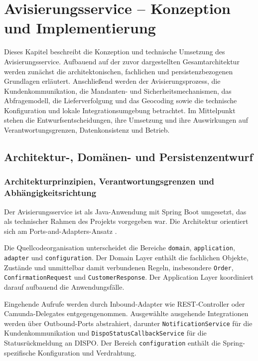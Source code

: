 \documentclass[
  12pt,
  a4paper,
  oneside
]{article}
\begin{document}
\tableofcontents
\clearpage

\setcounter{section}{4}

\section{Avisierungsservice -- Konzeption und Implementierung}

Dieses Kapitel beschreibt die Konzeption und technische Umsetzung des
Avisierungsservice. Aufbauend auf der zuvor dargestellten Gesamtarchitektur
werden zunächst die architektonischen, fachlichen und persistenzbezogenen
Grundlagen erläutert. Anschließend werden der Avisierungsprozess, die
Kundenkommunikation, die Mandanten- und
Sicherheitsmechanismen, das Abfragemodell, die Lieferverfolgung und das
Geocoding sowie die technische Konfiguration und lokale Integrationsumgebung
betrachtet. Im Mittelpunkt stehen die Entwurfsentscheidungen, ihre Umsetzung
und ihre Auswirkungen auf Verantwortungsgrenzen, Datenkonsistenz und Betrieb.

\subsection{Architektur-, Domänen- und Persistenzentwurf}
\label{sec:architektur-domaenenentwurf}

\subsubsection{Architekturprinzipien, Verantwortungsgrenzen und Abhängigkeitsrichtung}
\label{sec:architekturprinzipien}

Der Avisierungsservice ist als Java-Anwendung mit Spring Boot umgesetzt, das
als technischer Rahmen des Projekts vorgegeben war. Die Architektur orientiert
sich am Ports-and-Adapters-Ansatz \parencite{cockburn2005hexagonal}.

Die Quellcodeorganisation unterscheidet die Bereiche \texttt{domain},
\texttt{application}, \texttt{adapter} und \texttt{configuration}. Der Domain
Layer enthält die fachlichen Objekte, Zustände und unmittelbar damit
verbundenen Regeln, insbesondere \texttt{Order},
\texttt{ConfirmationRequest} und \texttt{CustomerResponse}. Der Application
Layer koordiniert darauf aufbauend die Anwendungsfälle.

Eingehende Aufrufe werden durch Inbound-Adapter wie REST-Controller oder
Camunda-Delegates entgegengenommen. Ausgewählte ausgehende Integrationen werden
über Outbound-Ports abstrahiert, darunter \texttt{NotificationService} für die
Kundenkommunikation und \texttt{DispoStatusCallbackService} für die
Statusrückmeldung an DISPO. Der Bereich \texttt{configuration} enthält die
Spring-spezifische Konfiguration und Verdrahtung.
\end{document}
